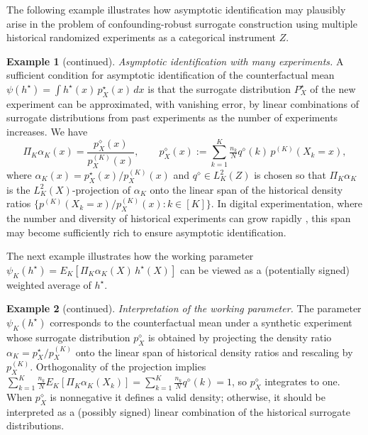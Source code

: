 \documentclass[11pt]{article}
\theoremstyle{plain}
\theoremstyle{definition}
\newtheorem{example}{Example}
\theoremstyle{remark}
\theoremstyle{definition}
\begin{document}
The following example illustrates how asymptotic identification may plausibly
arise in the problem of confounding-robust surrogate construction using multiple
historical randomized experiments as a categorical instrument \(Z\).

\setcounter{example}{1}
\begin{example}[continued]
\textit{Asymptotic identification with many experiments.}
A sufficient condition for asymptotic identification of the counterfactual mean
\(\psi(h^\star)=\int h^\star(x)\,p_X^\star(x)\,dx\)
is that the surrogate distribution \(P_X^\star\) of the new experiment can be
approximated, with vanishing error, by linear combinations of surrogate
distributions from past experiments as the number of experiments increases. We have
\[
\Pi_K \alpha_K(x)
  = \frac{p_X^{\diamond}(x)}{p_X^{(K)}(x)}, \qquad  
p_X^{\diamond}(x)
  := \sum_{k=1}^K \tfrac{n_k}{N} q^{\diamond}(k)\,p^{(K)}(X_k=x),
\]
where \(\alpha_K(x)=p_X^\star(x)/p_X^{(K)}(x)\) and \(q^{\diamond}\in L^2_K(Z)\)
is chosen so that \(\Pi_K\alpha_K\) is the \(L^2_K(X)\)-projection of
\(\alpha_K\) onto the linear span of the historical density ratios
\(\{p^{(K)}(X_k=x)/p_X^{(K)}(x):k\in[K]\}\). In digital experimentation, where the number and diversity of historical
experiments can grow rapidly \citep{duan2021online, athey2019surrogate}, this
span may become sufficiently rich to ensure asymptotic identification.
\end{example}


The next example illustrates how the working parameter  
\(\psi_K(h^\star)=E_K[\Pi_K \alpha_K(X)\,h^\star(X)]\) can be viewed as a
(potentially signed) weighted average of \(h^\star\).


\setcounter{example}{2}
\begin{example}[continued]
\textit{Interpretation of the working parameter.}
The parameter \(\psi_K(h^\star)\) corresponds to the counterfactual mean under a
synthetic experiment whose surrogate distribution \(p_X^{\diamond}\) is obtained
by projecting the density ratio \(\alpha_K = p_X^\star/p_X^{(K)}\) onto the
linear span of historical density ratios and rescaling by \(p_X^{(K)}\). 
Orthogonality of the projection implies
\(\sum_{k=1}^K \tfrac{n_k}{N} E_K[\Pi_K \alpha_K(X_k)]
  = \sum_{k=1}^K \tfrac{n_k}{N} q^{\diamond}(k) = 1\), so \(p_X^{\diamond}\)
integrates to one. When \(p_X^{\diamond}\) is nonnegative it defines a valid
density; otherwise, it should be interpreted as a (possibly signed) linear
combination of the historical surrogate distributions.
\end{example}
\end{document}
